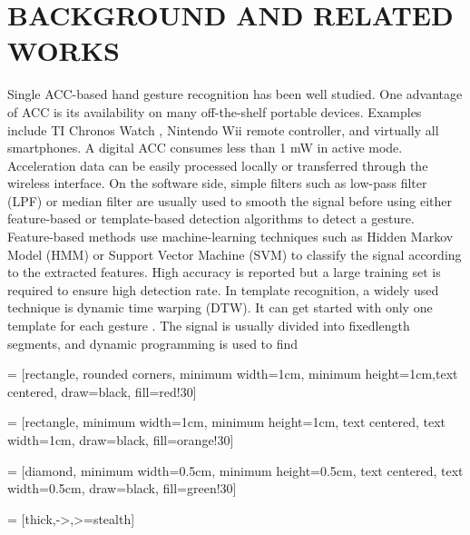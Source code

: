 \section{BACKGROUND AND RELATED WORKS}
Single ACC-based hand gesture recognition has been well
studied. One advantage of ACC is its availability on many
off-the-shelf portable devices. Examples include TI Chronos
Watch \cite{c5}, Nintendo Wii remote controller, and virtually all
smartphones. A digital ACC consumes less than 1 mW in
active mode. Acceleration data can be easily processed locally
or transferred through the wireless interface. On the software
side, simple filters such as low-pass filter (LPF) or median
filter \cite{c12} are usually used to smooth the signal before using
either feature-based or template-based detection algorithms to
detect a gesture. Feature-based methods use machine-learning
techniques such as Hidden Markov Model (HMM) or Support
Vector Machine (SVM) \cite{c3} to classify the signal according
to the extracted features. High accuracy is reported \cite{c13} but
a large training set is required to ensure high detection rate.
In template recognition, a widely used technique is dynamic
time warping (DTW). It can get started with only one template
for each gesture \cite{c14}. The signal is usually divided into fixedlength
segments, and dynamic programming is used to find

 = [rectangle, rounded corners, minimum width=1cm, minimum height=1cm,text centered, draw=black, fill=red!30]

 = [rectangle, minimum width=1cm, minimum height=1cm, text centered, text width=1cm, draw=black, fill=orange!30]

 = [diamond, minimum width=0.5cm, minimum height=0.5cm, text centered, text width=0.5cm, draw=black, fill=green!30]

 = [thick,->,>=stealth]


